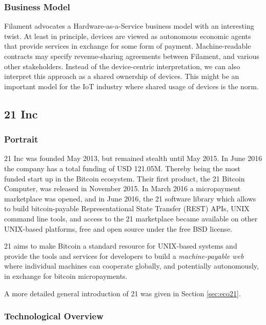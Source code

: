 
\subsubsection{Business Model}

Filament advocates a Hardware-as-a-Service business model with an interesting twist. At least in principle,  devices are viewed as autonomous economic agents that provide services in exchange for some form of payment. Machine-readable contracts may specify revenue-sharing agreements between Filament, and various other stakeholders. Instead of the device-centric interpretation, we can also interpret this approach as a shared ownership of devices. This might be an important model for the IoT industry where shared usage of devices is the norm.


\subsection{21 Inc}

\subsubsection{Portrait}
21 Inc was founded May 2013, but remained stealth until May 2015. In June 2016 the company has a total funding of USD 121.05M. Thereby being the most funded start up in the Bitcoin ecosystem. Their first product, the 21 Bitcoin Computer, was released in November 2015. In March 2016 a micropayment marketplace was opened, and in June 2016, the 21 software library which allows to build bitcoin-payable Representational State Transfer (REST) APIs, UNIX command line tools, and access to the 21 marketplace became available on other UNIX-based platforms, free and open source under the free BSD license.

21 aims to make Bitcoin a standard resource for UNIX-based systems and provide the tools and services for developers to build a \emph{machine-payable web} where individual machines can cooperate globally, and potentially autonomously, in exchange for bitcoin micropayments.

A more detailed general introduction of 21 was given in Section \ref{sec:eco21}.

\subsubsection{Technological Overview}

